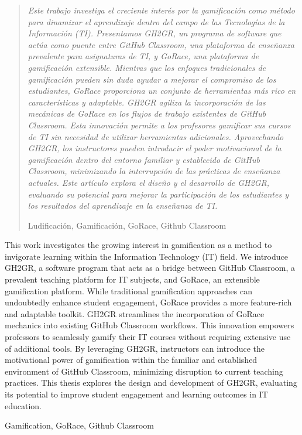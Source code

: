 \newpage 
\thispagestyle{empty}

\begin{abstract}
{\em
Este trabajo investiga el creciente interés por la gamificación como método para dinamizar el aprendizaje dentro del campo de las Tecnologías de la Información (TI). Presentamos GH2GR, un programa de software que actúa como puente entre GitHub Classroom, una plataforma de enseñanza prevalente para asignaturas de TI, y GoRace, una plataforma de gamificación extensible. Mientras que los enfoques tradicionales de gamificación pueden sin duda ayudar a mejorar el compromiso de los estudiantes, GoRace proporciona un conjunto de herramientas más rico en características y adaptable. GH2GR agiliza la incorporación de las mecánicas de GoRace en los flujos de trabajo existentes de GitHub Classroom. Esta innovación permite a los profesores gamificar sus cursos de TI sin necesidad de utilizar herramientas adicionales. Aprovechando GH2GR, los instructores pueden introducir el poder motivacional de la gamificación dentro del entorno familiar y establecido de GitHub Classroom, minimizando la interrupción de las prácticas de enseñanza actuales. Este artículo explora el diseño y el desarrollo de GH2GR, evaluando su potencial para mejorar la participación de los estudiantes y los resultados del aprendizaje en la enseñanza de TI.
}



\begin{palabrasClave}
Ludificación, Gamificación, GoRace, Github Classroom
\end{palabrasClave}

\end{abstract}
\newpage 
\vspace*{200px}
\thispagestyle{empty}

\begin{summary}
{
This work investigates the growing interest in gamification as a method to invigorate learning within the Information Technology (IT) field. We introduce GH2GR, a software program that acts as a bridge between GitHub Classroom, a prevalent teaching platform for IT subjects, and GoRace, an extensible gamification platform. While traditional gamification approaches can undoubtedly enhance student engagement, GoRace provides a more feature-rich and adaptable toolkit. GH2GR streamlines the incorporation of GoRace mechanics into existing GitHub Classroom workflows. This innovation empowers professors to seamlessly gamify their IT courses without requiring extensive use of additional tools. By leveraging GH2GR, instructors can introduce the motivational power of gamification within the familiar and established environment of GitHub Classroom, minimizing disruption to current teaching practices. This thesis explores the design and development of GH2GR, evaluating its potential to improve student engagement and learning outcomes in IT education.
}

\em
\begin {keywords}
Gamification, GoRace, Github Classroom
\end {keywords}

\end{summary}